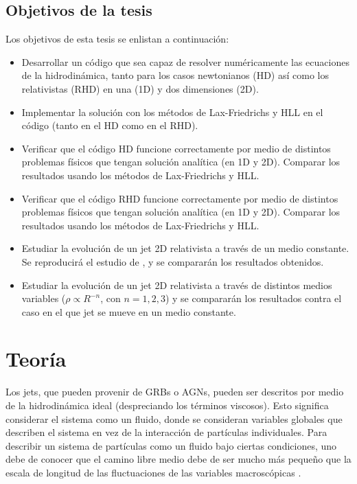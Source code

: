 \documentclass[12pt,a4paper]{book}
\begin{document}
\section{Objetivos de la tesis}
Los objetivos de esta tesis se enlistan a continuación:
\begin{itemize}
  \item Desarrollar un código que sea capaz de resolver numéricamente las ecuaciones de la hidrodinámica, tanto para los casos newtonianos (HD) así como los relativistas (RHD) en una (1D) y dos dimensiones (2D). 
  
  \item Implementar la solución con los métodos de Lax-Friedrichs y HLL en el código (tanto en el HD como en el RHD).
  
  \item Verificar que el código HD funcione correctamente por medio de distintos problemas físicos que tengan solución analítica (en 1D y 2D). Comparar los resultados usando los métodos de Lax-Friedrichs y HLL.

  \item Verificar que el código RHD funcione correctamente por medio de distintos problemas físicos que tengan solución analítica (en 1D y 2D). Comparar los resultados usando los métodos de Lax-Friedrichs y HLL.
  
  \item Estudiar la evolución de un jet 2D relativista a través de un medio constante. Se reproducirá el estudio de \citet{MB-HLLC-I}, y se compararán los resultados obtenidos.

  \item Estudiar la evolución de un jet 2D relativista a través de distintos medios variables ($\rho \propto R^{-n}$, con $n=1, 2, 3$) y se compararán los resultados contra el caso en el que jet se mueve en un medio constante.

\end{itemize}





\chapter{Teoría}

Los jets, que pueden provenir de GRBs o AGNs, pueden ser descritos por medio de la hidrodinámica ideal (despreciando los términos viscosos). Esto significa considerar el sistema como un fluido, donde se consideran
variables globales que describen el sistema en vez de la interacción de partículas individuales.
Para describir un sistema de partículas como un fluido bajo ciertas condiciones, uno debe de conocer que el camino libre medio debe de ser mucho más pequeño que la escala de longitud de las 
fluctuaciones de las variables macroscópicas \citep{LeVeque1998}.
\end{document}
